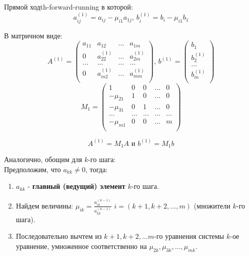 \documentclass[14pt]{extarticle}
\begin{document}
\begin{theorem}{Прямой ход}{th-forward-running}
            в которой:
            $$a_{ij}^{(1)} = a_{ij} - \mu_{i1}a_{1j} \text{, } b_{i}^{(1)} = b_{i} - \mu_{i1}b_{1}$$

            В матричном виде:
            $$
            A^{(1)} = \begin{pmatrix}
                a_{11} & a_{12} & \ldots & a_{1m}\\
                0 & a_{22}^{(1)} & \ldots & a_{2m}^{(1)}\\
                \ldots & \ldots & \ldots & \ldots\\
                0 & a_{m2}^{(1)} & \ldots & a_{mm}^{(1)}\\
            \end{pmatrix}
            \text{, }
            b^{(1)} = \begin{pmatrix}
                b_{1}\\
                b_{2}^{(1)}\\
                \ldots\\
                b_{m}^{(1)}\\
            \end{pmatrix}
            $$
            $$
            M_{1} = \begin{pmatrix}
                1 & 0 & 0 & \ldots & 0\\
                -\mu_{21} & 1 & 0 & \ldots & 0\\
                -\mu_{31} & 0 & 1 & \ldots & 0\\
                \ldots & \ldots & \ldots & \ldots & \ldots\\
                -\mu_{m1} & 0 & 0 & \ldots & m\\
            \end{pmatrix}
            $$

            $$A^{(1)} = M_{1}A \text{ и } b^{(1)} = M_{1}b$$

            \vspace{\baselineskip}

            Аналогично, обощим для $k$-го шага:\\
            Предположим, что $a_{kk} \neq 0$, тогда: 
            \begin{enumerate}
                \item $a_{kk}$ - \textbf{главный (ведущий) элемент} $k$-го шага.
                \item Найдем величины: $\mu_{ik} = \frac{a_{ik}^{(k - 1)}}{a_{kk}^{(k - 1)}}$ $i = (k+1, k+2, \ldots, m)$ (множители $k$-го шага).
                \item Последовательно вычтем из $k+1, k+2, \ldots m$-го уравнения системы $k$-ое уравнение, умноженное соответственно на $\mu_{2k}, \mu_{3k}, \ldots, \mu_{mk}$.
            \end{enumerate}


\end{theorem}
\end{document}
